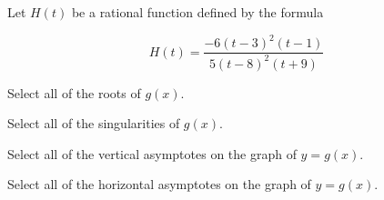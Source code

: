 \documentclass{ximera}
\author{Lee Wayand}
\begin{document}
\begin{exercise}




Let $H(t)$ be a rational function defined by the formula

\[
H(t) = \frac{-6(t-3)^2(t-1)}{5(t-8)^2(t+9)}
\]


\begin{question}


Select all of the roots of $g(x)$.

\begin{selectAll}
\end{selectAll}

\end{question}






\begin{question}


Select all of the singularities of $g(x)$.

\begin{selectAll}
\end{selectAll}

\end{question}










\begin{question}


Select all of the vertical asymptotes on the graph of $y = g(x)$.

\begin{selectAll}
\end{selectAll}

\end{question}












\begin{question}


Select all of the horizontal asymptotes on the graph of $y = g(x)$.

\begin{selectAll}
\end{selectAll}


\end{question}
\end{exercise}
\end{document}
